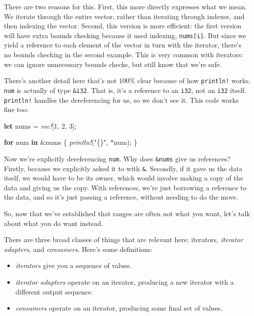 \documentclass[a4paper,]{book}
\newenvironment{Shaded}{\begin{snugshade}}{\end{snugshade}}
\newcommand{\KeywordTok}[1]{\textcolor[rgb]{0.13,0.29,0.53}{\textbf{{#1}}}}
\newcommand{\DecValTok}[1]{\textcolor[rgb]{0.00,0.00,0.81}{{#1}}}
\newcommand{\StringTok}[1]{\textcolor[rgb]{0.31,0.60,0.02}{{#1}}}
\newcommand{\PreprocessorTok}[1]{\textcolor[rgb]{0.56,0.35,0.01}{\textit{{#1}}}}
\newcommand{\NormalTok}[1]{{#1}}
\providecommand{\tightlist}{%
  \setlength{\itemsep}{0pt}\setlength{\parskip}{0pt}}
\begin{document}
There are two reasons for this. First, this more directly expresses what
we mean. We iterate through the entire vector, rather than iterating
through indexes, and then indexing the vector. Second, this version is
more efficient: the first version will have extra bounds checking
because it used indexing, \texttt{nums{[}i{]}}. But since we yield a
reference to each element of the vector in turn with the iterator,
there's no bounds checking in the second example. This is very common
with iterators: we can ignore unnecessary bounds checks, but still know
that we're safe.

There's another detail here that's not 100\% clear because of how
\texttt{println!} works. \texttt{num} is actually of type
\texttt{\&i32}. That is, it's a reference to an \texttt{i32}, not an
\texttt{i32} itself. \texttt{println!} handles the dereferencing for us,
so we don't see it. This code works fine too:

\begin{Shaded}
\begin{Highlighting}[]
\KeywordTok{let} \NormalTok{nums = }\PreprocessorTok{vec!}\NormalTok{[}\DecValTok{1}\NormalTok{, }\DecValTok{2}\NormalTok{, }\DecValTok{3}\NormalTok{];}

\KeywordTok{for} \NormalTok{num }\KeywordTok{in} \NormalTok{&nums \{}
    \PreprocessorTok{println!}\NormalTok{(}\StringTok{"\{\}"}\NormalTok{, *num);}
\NormalTok{\}}
\end{Highlighting}
\end{Shaded}

Now we're explicitly dereferencing \texttt{num}. Why does
\texttt{\&nums} give us references? Firstly, because we explicitly asked
it to with \texttt{\&}. Secondly, if it gave us the data itself, we
would have to be its owner, which would involve making a copy of the
data and giving us the copy. With references, we're just borrowing a
reference to the data, and so it's just passing a reference, without
needing to do the move.

So, now that we've established that ranges are often not what you want,
let's talk about what you do want instead.

There are three broad classes of things that are relevant here:
iterators, \emph{iterator adapters}, and \emph{consumers}. Here's some
definitions:

\begin{itemize}
\tightlist
\item
  \emph{iterators} give you a sequence of values.
\item
  \emph{iterator adapters} operate on an iterator, producing a new
  iterator with a different output sequence.
\item
  \emph{consumers} operate on an iterator, producing some final set of
  values.
\end{itemize}
\end{document}

